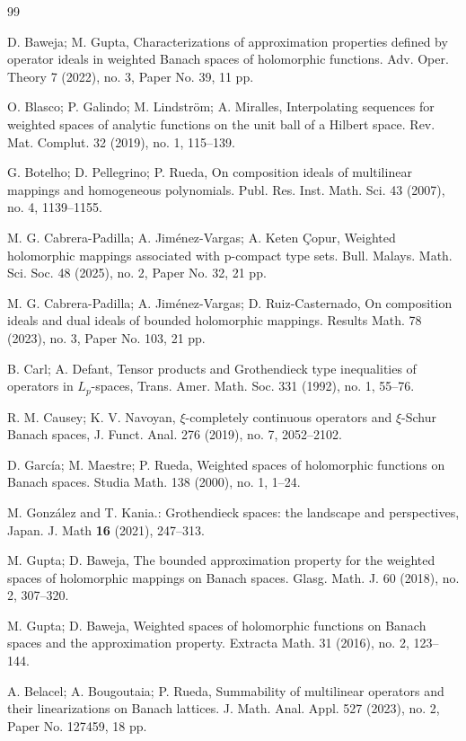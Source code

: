 \documentclass[12pt]{amsart}
\theoremstyle{plain}
\numberwithin{equation}{section}
\begin{document}
\begin{thebibliography}{99}

  D. Baweja; M. Gupta, Characterizations of approximation properties defined by operator ideals in weighted Banach spaces of holomorphic functions. Adv. Oper. Theory 7 (2022), no. 3, Paper No. 39, 11 pp.

 O. Blasco; P. Galindo; M. Lindstr\"om; A. Miralles, Interpolating sequences for weighted spaces of analytic functions on the unit ball of a Hilbert space. Rev. Mat. Complut. 32 (2019), no. 1, 115--139.

 G. Botelho; D. Pellegrino; P. Rueda, On composition ideals of multilinear mappings and homogeneous polynomials. Publ. Res. Inst. Math. Sci. 43 (2007), no. 4, 1139--1155.

 M. G. Cabrera-Padilla; A. Jim\'enez-Vargas; A. Keten Çopur,  Weighted holomorphic mappings associated with p-compact type sets. Bull. Malays. Math. Sci. Soc. 48 (2025), no. 2, Paper No. 32, 21 pp.

 M. G. Cabrera-Padilla; A. Jim\'enez-Vargas; D. Ruiz-Casternado, On composition ideals and dual ideals of bounded holomorphic mappings. Results Math. 78 (2023), no. 3, Paper No. 103, 21 pp.

 B. Carl; A. Defant, Tensor products and Grothendieck type inequalities of operators in $L_p$-spaces, Trans. Amer. Math. Soc.
331 (1992), no. 1, 55--76.

 R. M. Causey; K. V. Navoyan, $\xi$-completely continuous operators and $\xi$-Schur Banach spaces, J. Funct. Anal. 276 (2019), no.
7, 2052--2102.


  D. Garc\'ia; M. Maestre; P. Rueda, Weighted spaces of holomorphic functions on Banach spaces. Studia Math. 138 (2000), no. 1, 1--24.


 M. Gonz\'{a}lez and T. Kania.: Grothendieck spaces: the
landscape and perspectives, Japan. J. Math \textbf{16} (2021), 247--313.

 M. Gupta; D. Baweja, The bounded approximation property for the weighted spaces of holomorphic mappings on Banach spaces. Glasg. Math. J. 60 (2018), no. 2, 307--320.

 M. Gupta; D. Baweja,  Weighted spaces of holomorphic functions on Banach spaces and the approximation property. Extracta Math. 31 (2016), no. 2, 123--144.

 A. Belacel; A. Bougoutaia; P. Rueda,  Summability of multilinear operators and their linearizations on Banach lattices. J. Math. Anal. Appl. 527 (2023), no. 2, Paper No. 127459, 18 pp. 


\end{thebibliography}
\end{document}
